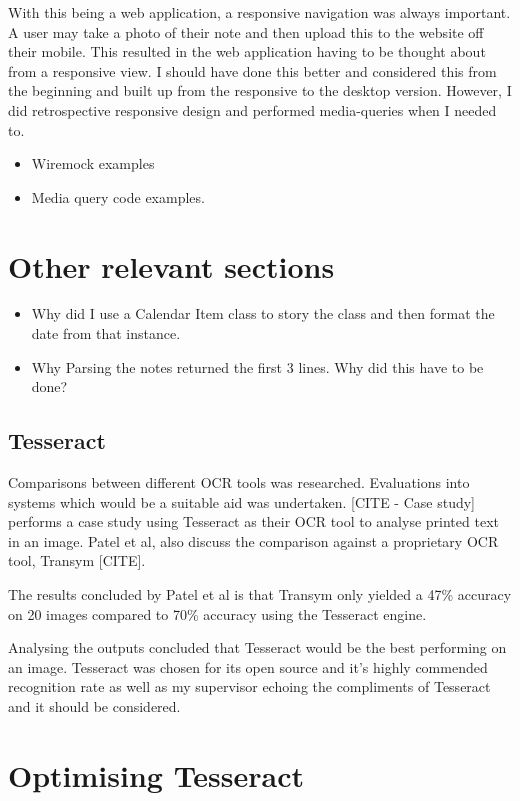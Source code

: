 With this being a web application, a responsive navigation was always important. A user may take a photo of their note and then upload this to the website off their mobile. This resulted in the web application having to be thought about from a responsive view. I should have done this better and considered this from the beginning and built up from the responsive to the desktop version. However, I did retrospective responsive design and performed media-queries when I needed to.
\begin{itemize}
  \item Wiremock examples
  \item Media query code examples.
\end{itemize}
\section{Other relevant sections}
\begin{itemize}
  \item Why did I use a Calendar Item class to story the class and then format the date from that instance.
  \item Why Parsing the notes returned the first 3 lines. Why did this have to be done?

\end{itemize}

\subsection{Tesseract}
Comparisons between different OCR tools was researched. Evaluations into systems which would be a suitable aid was undertaken. [CITE - Case study] performs a case study using Tesseract as their OCR tool to analyse printed text in an image. Patel et al, also discuss the comparison against a proprietary OCR tool, Transym [CITE].

The results concluded by Patel et al is that Transym only yielded a 47\% accuracy on 20 images compared to 70\% accuracy using the Tesseract engine.

Analysing the outputs concluded that Tesseract would be the best performing on an image. Tesseract was chosen for its open source and it's highly commended recognition rate as well as my supervisor echoing the compliments of Tesseract and it should be considered.

\section{Optimising Tesseract}

